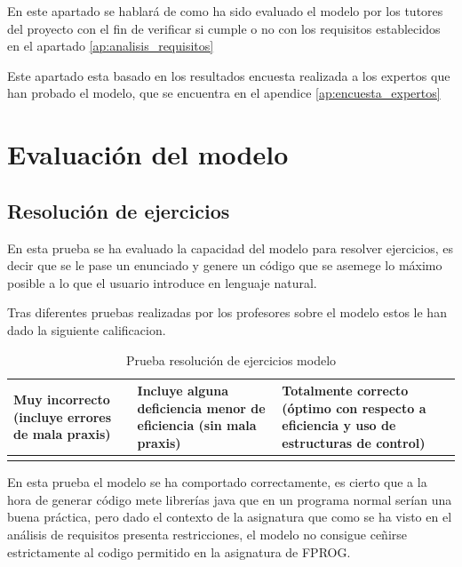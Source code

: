 
En este apartado se hablará de como ha sido evaluado el modelo por los tutores del proyecto con el fin de verificar si cumple o no con los requisitos establecidos en el apartado \ref{ap:analisis_requisitos}

Este apartado esta basado en los resultados encuesta realizada a los expertos que han probado el modelo, que se encuentra en el apendice \ref{ap:encuesta_expertos}

\section{Evaluación del modelo}

\subsection{Resolución de ejercicios}

En esta prueba se ha evaluado la capacidad del modelo para resolver ejercicios, es decir que se le pase un enunciado y genere un código que se asemege lo máximo posible a lo que el usuario introduce en lenguaje natural.

Tras diferentes pruebas realizadas por los profesores sobre el modelo estos le han dado la siguiente calificacion.

\begin{table}[htb]
    \centering
    \begin{tabular}{| >{\arraybackslash}m{}| >{\arraybackslash}m{} | >{\arraybackslash}m{}|} \hline
    \vspace{0.5em}  Muy incorrecto (incluye errores de mala praxis) \vspace{0.5em} &  Incluye alguna deficiencia menor de eficiencia (sin mala praxis) & Totalmente correcto (óptimo con respecto a eficiencia y uso de estructuras de control) \\ \hline
     & \multicolumn{1}{|c|}{X} & \\ \hline 
    \end{tabular}\caption{Prueba resolución de ejercicios modelo}
    \label{tabla:evaluacion-ej1}
\end{table}

En esta prueba el modelo se ha comportado correctamente, es cierto que a la hora de generar código mete librerías java que en un programa normal serían una buena práctica, pero dado el contexto de la asignatura que como se ha visto en el análisis de requisitos presenta restricciones, el modelo no consigue ceñirse estrictamente al codigo permitido en la asignatura de FPROG.


